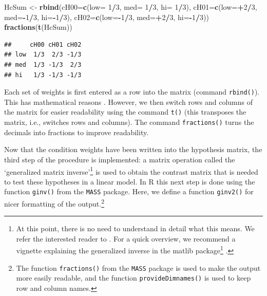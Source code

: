 \documentclass[12pt,]{krantz}
\newenvironment{Shaded}{\begin{snugshade}}{\end{snugshade}}
\newcommand{\DataTypeTok}[1]{\textcolor[rgb]{0.13,0.29,0.53}{#1}}
\newcommand{\DecValTok}[1]{\textcolor[rgb]{0.00,0.00,0.81}{#1}}
\newcommand{\KeywordTok}[1]{\textcolor[rgb]{0.13,0.29,0.53}{\textbf{#1}}}
\newcommand{\NormalTok}[1]{#1}
\newcommand{\OperatorTok}[1]{\textcolor[rgb]{0.81,0.36,0.00}{\textbf{#1}}}
\newcommand{\StringTok}[1]{\textcolor[rgb]{0.31,0.60,0.02}{#1}}
\renewcommand{\href}[2]{#2\footnote{\url{#1}}}
\begin{document}
\begin{Shaded}
\begin{Highlighting}[]
\NormalTok{HcSum <-}\StringTok{ }\KeywordTok{rbind}\NormalTok{(}\DataTypeTok{cH00=}\KeywordTok{c}\NormalTok{(}\DataTypeTok{low=} \DecValTok{1}\OperatorTok{/}\DecValTok{3}\NormalTok{, }\DataTypeTok{med=} \DecValTok{1}\OperatorTok{/}\DecValTok{3}\NormalTok{, }\DataTypeTok{hi=} \DecValTok{1}\OperatorTok{/}\DecValTok{3}\NormalTok{), }
               \DataTypeTok{cH01=}\KeywordTok{c}\NormalTok{(}\DataTypeTok{low=}\OperatorTok{+}\DecValTok{2}\OperatorTok{/}\DecValTok{3}\NormalTok{, }\DataTypeTok{med=}\OperatorTok{-}\DecValTok{1}\OperatorTok{/}\DecValTok{3}\NormalTok{, }\DataTypeTok{hi=}\OperatorTok{-}\DecValTok{1}\OperatorTok{/}\DecValTok{3}\NormalTok{), }
               \DataTypeTok{cH02=}\KeywordTok{c}\NormalTok{(}\DataTypeTok{low=}\OperatorTok{-}\DecValTok{1}\OperatorTok{/}\DecValTok{3}\NormalTok{, }\DataTypeTok{med=}\OperatorTok{+}\DecValTok{2}\OperatorTok{/}\DecValTok{3}\NormalTok{, }\DataTypeTok{hi=}\OperatorTok{-}\DecValTok{1}\OperatorTok{/}\DecValTok{3}\NormalTok{))}
\KeywordTok{fractions}\NormalTok{(}\KeywordTok{t}\NormalTok{(HcSum))}
\end{Highlighting}
\end{Shaded}

\begin{verbatim}
##     cH00 cH01 cH02
## low  1/3  2/3 -1/3
## med  1/3 -1/3  2/3
## hi   1/3 -1/3 -1/3
\end{verbatim}

Each set of weights is first entered as a row into the matrix (command \texttt{rbind()}). This has mathematical reasons \citep[see][]{schad2020capitalize}. However, we then switch rows and columns of the matrix for easier readability using the command \texttt{t()} (this transposes the matrix, i.e., switches rows and columns). The command \texttt{fractions()} turns the decimals into fractions to improve readability.

Now that the condition weights have been written into the hypothesis matrix, the third step of the procedure is implemented: a matrix operation called the `generalized matrix inverse'\footnote{At this point, there is no need to understand in detail what this means. We refer the interested reader to \citet{schad2020capitalize}. For a quick overview, we recommend a vignette explaining the generalized inverse in the \href{https://cran.r-project.org/web/packages/matlib/vignettes/ginv.html}{matlib package} \citep{friendly_matlib}.} is used to obtain the contrast matrix that is needed to test these hypotheses in a linear model.
In R this next step is done using the function \texttt{ginv()} from the \texttt{MASS} package. Here, we define a function \texttt{ginv2()} for nicer formatting of the output.\footnote{The function \texttt{fractions()} from the \texttt{MASS} package is used to make the output more easily readable, and the function \texttt{provideDimnames()} is used to keep row and column names.}
\end{document}
